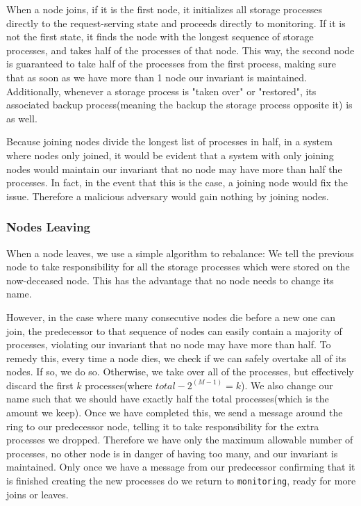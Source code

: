 \documentclass[a4paper]{article}
\begin{document}
When a node joins, if it is the first node, it initializes all storage processes directly to the request-serving state and proceeds directly to monitoring. If it is not the first state, it finds the node with the longest sequence of storage processes, and takes half of the processes of that node. This way, the second node is guaranteed to take half of the processes from the first process, making sure that as soon as we have more than 1 node our invariant is maintained. Additionally, whenever a storage process is "taken over" or "restored", its associated backup process(meaning the backup the storage process opposite it) is as well.

Because joining nodes divide the longest list of processes in half, in a system where nodes only joined, it would be evident that a system with only joining nodes would maintain our invariant that no node may have more than half the processes. In fact, in the event that this is the case, a joining node would fix the issue. Therefore a malicious adversary would gain nothing by joining nodes.

\subsubsection{Nodes Leaving}

When a node leaves, we use a simple algorithm to rebalance: We tell the previous node to take responsibility for all the storage processes which were stored on the now-deceased node. This has the advantage that no node needs to change its name.

However, in the case where many consecutive nodes die before a new one can join, the predecessor to that sequence of nodes can easily contain a majority of processes, violating our invariant that no node may have more than half. To remedy this, every time a node dies, we check if we can safely overtake all of its nodes. If so, we do so. Otherwise, we take over all of the processes, but effectively discard the first $k$ processes(where $total - 2^(M-1) = k$). We also change our name such that we should have exactly half the total processes(which is the amount we keep). Once we have completed this, we send a message around the ring to our predecessor node, telling it to take responsibility for the extra processes we dropped. Therefore we have only the maximum allowable number of processes, no other node is in danger of having too many, and our invariant is maintained. Only once we have a message from our predecessor confirming that it is finished creating the new processes do we return to {\tt monitoring}, ready for more joins or leaves. 
\end{document}
